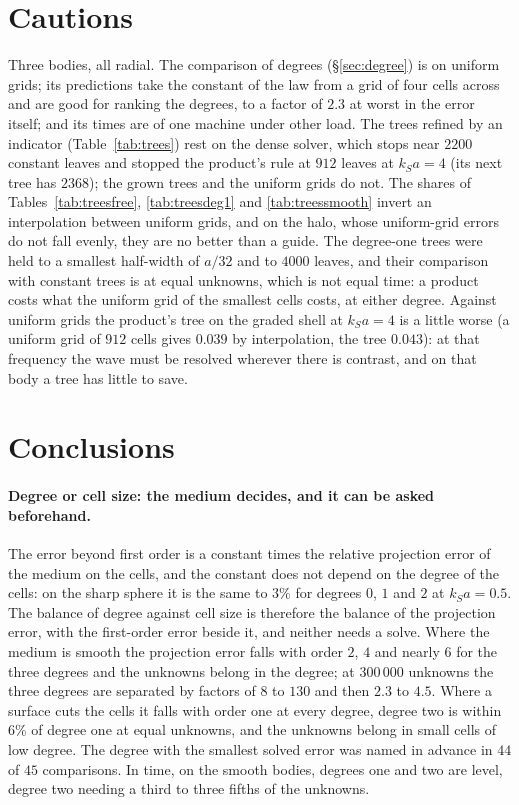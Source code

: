 \documentclass[11pt,a4paper]{article}
\begin{document}
\section{Cautions}\label{sec:cautions}

Three bodies, all radial. The comparison of degrees (\S\ref{sec:degree}) is on uniform grids; its
predictions take the constant of the law from a grid of four cells across and are good for ranking the
degrees, to a factor of $2.3$ at worst in the error itself; and its times are of one machine under other
load. The trees refined by an indicator (Table~\ref{tab:trees}) rest on the dense
solver, which stops near $2200$ constant leaves and stopped the product's rule at $912$ leaves at
$k_Sa=4$ (its next tree has $2368$); the grown trees and the uniform grids do not. The shares of
Tables~\ref{tab:treesfree}, \ref{tab:treesdeg1} and \ref{tab:treessmooth} invert an interpolation between
uniform grids, and on the halo, whose uniform-grid errors do not fall evenly, they are no better than a
guide. The degree-one trees were held to a smallest half-width of $a/32$ and to $4000$
leaves, and their comparison with constant trees is at equal unknowns, which is not equal time: a
product costs what the uniform grid of the smallest cells costs, at either degree. Against
uniform grids the product's tree on the graded shell at $k_Sa=4$ is a little worse (a uniform grid of
$912$ cells gives $0.039$ by interpolation, the tree $0.043$): at that frequency the wave must be
resolved wherever there is contrast, and on that body a tree has little to save.

\section{Conclusions}\label{sec:conclusions}

\paragraph{Degree or cell size: the medium decides, and it can be asked beforehand.} The error beyond
first order is a constant times the relative projection error of the medium on the cells, and the
constant does not depend on the degree of the cells: on the sharp sphere it is the same to $3\%$ for
degrees $0$, $1$ and $2$ at $k_Sa=0.5$. The balance of degree against cell size is therefore the balance
of the projection error, with the first-order error beside it, and neither needs a solve. Where the
medium is smooth the projection error falls with order $2$, $4$ and nearly $6$ for the three degrees and
the unknowns belong in the degree; at $300\,000$ unknowns the three degrees are separated by factors of
$8$ to $130$ and then $2.3$ to $4.5$. Where a surface cuts the cells it falls with order one at every
degree, degree two is within $6\%$ of degree one at equal unknowns, and the unknowns belong in small
cells of low degree. The degree with the smallest solved error was named in advance in $44$ of $45$
comparisons. In time, on the smooth bodies, degrees one and two are level, degree two needing a third to
three fifths of the unknowns.
\end{document}
